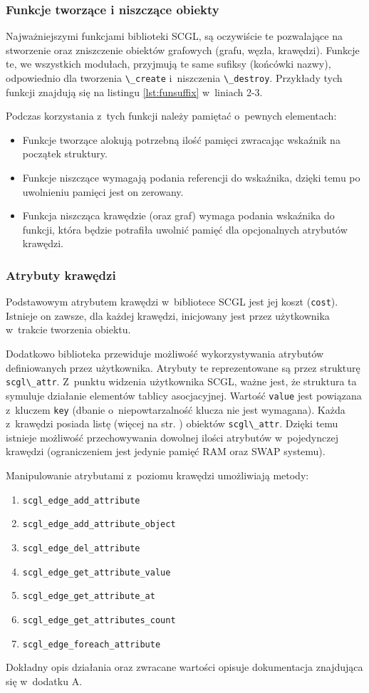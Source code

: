 \documentclass[a4paper,12pt,polish,oneside,openright]{thesis}
\newcommand\code[1]{\lstinline[style=line]{#1}}
\begin{document}
\subsubsection*{Funkcje tworzące i niszczące obiekty}
Najważniejszymi funkcjami biblioteki SCGL, są oczywiście te pozwalające na stworzenie oraz zniszczenie obiektów grafowych (grafu, węzła, krawędzi).
Funkcje te, we wszystkich modułach, przyjmują te same sufiksy (końcówki nazwy), odpowiednio dla tworzenia \code{\_create} i~niszczenia \code{\_destroy}.
Przykłady tych funkcji znajdują się na listingu \ref{lst:funsuffix} w~liniach 2-3.

Podczas korzystania z~tych funkcji należy pamiętać o~pewnych elementach:
\begin{itemize}
	\item Funkcje tworzące alokują potrzebną ilość pamięci zwracając wskaźnik na początek struktury.
	\item Funkcje niszczące wymagają podania referencji do wskaźnika, dzięki temu po uwolnieniu pamięci jest on zerowany.
	\item Funkcja niszcząca krawędzie (oraz graf) wymaga podania wskaźnika do funkcji, która będzie potrafiła uwolnić pamięć dla opcjonalnych atrybutów krawędzi.
\end{itemize}

\subsubsection*{Atrybuty krawędzi}
Podstawowym atrybutem krawędzi w~bibliotece SCGL jest jej koszt (\code{cost}).
Istnieje on zawsze, dla każdej krawędzi, inicjowany jest przez użytkownika w~trakcie tworzenia obiektu.

Dodatkowo biblioteka przewiduje możliwość wykorzystywania atrybutów definiowanych przez użytkownika.
Atrybuty te reprezentowane są przez strukturę \code{scgl\_attr}.
Z~punktu widzenia użytkownika SCGL, ważne jest, że struktura ta symuluje działanie elementów tablicy asocjacyjnej.
Wartość \code{value} jest powiązana z~kluczem \code{key} (dbanie o~niepowtarzalność klucza nie jest wymagana).
Każda z~krawędzi posiada listę (więcej na str. \pageref{chap:lists}) obiektów \code{scgl\_attr}.
Dzięki temu istnieje możliwość przechowywania dowolnej ilości atrybutów w~pojedynczej krawędzi (ograniczeniem jest jedynie pamięć RAM oraz SWAP systemu).

Manipulowanie atrybutami z~poziomu krawędzi umożliwiają metody:
\begin{enumerate}
	\item \code{scgl_edge_add_attribute}
	\item \code{scgl_edge_add_attribute_object}
	\item \code{scgl_edge_del_attribute}
	\item \code{scgl_edge_get_attribute_value}
	\item \code{scgl_edge_get_attribute_at}
	\item \code{scgl_edge_get_attributes_count}
	\item \code{scgl_edge_foreach_attribute}
\end{enumerate}
Dokładny opis działania oraz zwracane wartości opisuje dokumentacja znajdująca się w~dodatku A.
\end{document}
